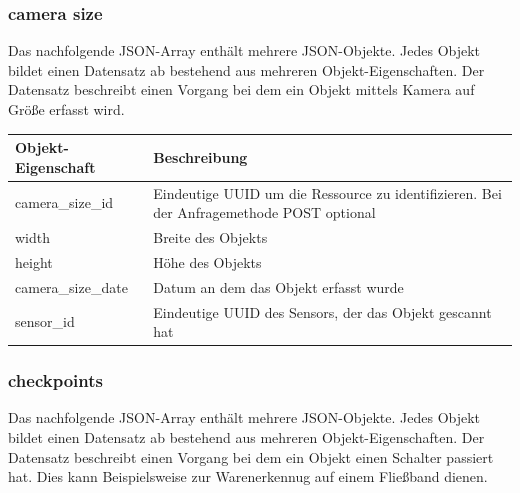 \subsubsection{camera size}%
\label{sec:rest.json.camera_size}
Das nachfolgende JSON-Array enthält mehrere JSON-Objekte. Jedes Objekt bildet einen Datensatz ab bestehend aus mehreren Objekt-Eigenschaften. Der Datensatz beschreibt einen Vorgang bei dem ein Objekt mittels Kamera auf Größe erfasst wird.

\begin{jsoncode}
\end{jsoncode}

\begin{table}[H]
  \begin{tabularx}{\textwidth}{lX}
    \textbf{Objekt-Eigenschaft} & \textbf{Beschreibung} \\ \toprule
    camera\_size\_id            & Eindeutige UUID um die Ressource zu identifizieren. Bei der Anfragemethode POST optional  \\
    width                       & Breite des Objekts \\
    height                      & Höhe des Objekts  \\
    camera\_size\_date          & Datum an dem das Objekt erfasst wurde \\
    sensor\_id                  & Eindeutige UUID des Sensors, der das Objekt gescannt hat
  \end{tabularx}
\end{table}

\subsubsection{checkpoints}%
\label{sec:rest.json.checkpoints}
Das nachfolgende JSON-Array enthält mehrere JSON-Objekte. Jedes Objekt bildet einen Datensatz ab bestehend aus mehreren Objekt-Eigenschaften. Der Datensatz beschreibt einen Vorgang bei dem ein Objekt einen Schalter passiert hat. Dies kann Beispielsweise zur Warenerkennug auf einem Fließband dienen.

